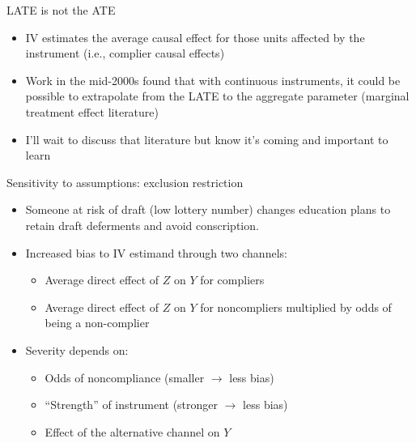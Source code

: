 \documentclass{beamer}
\begin{document}
\begin{frame}{LATE is not the ATE}

  \begin{itemize}
    \item IV estimates the average causal effect for those units affected by the instrument (i.e., complier causal effects)
    \item Work in the mid-2000s found that with continuous instruments, it could be possible to extrapolate from the LATE to the aggregate parameter (marginal treatment effect literature)
    \item I'll wait to discuss that literature but know it's coming and important to learn
  \end{itemize}

\end{frame}


\begin{frame}{Sensitivity to assumptions: exclusion restriction}

  \begin{itemize}

    \item Someone at risk of draft (low lottery number) changes education plans to retain draft deferments and avoid conscription.

    \item Increased bias to IV estimand through two channels:
          \begin{itemize}
            \item Average direct effect of $Z$ on $Y$ for compliers
            \item Average direct effect of $Z$ on $Y$ for noncompliers multiplied by odds of being a non-complier
          \end{itemize}

    \item Severity depends on:
          \begin{itemize}
            \item Odds of noncompliance (smaller $\rightarrow$ less bias)
            \item ``Strength'' of instrument (stronger $\rightarrow$ less bias)
            \item Effect of the alternative channel on $Y$
          \end{itemize}
  \end{itemize}

\end{frame}
\end{document}
